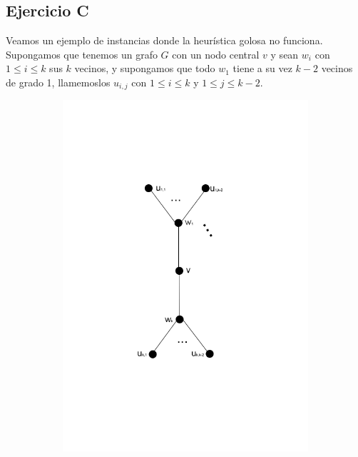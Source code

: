 \subsection{Ejercicio C}

Veamos un ejemplo de instancias donde la heurística golosa no funciona. Supongamos que tenemos un grafo $G$ con un nodo central $v$ y sean $w_i$ con $1 \leq i \leq k$ sus $k$ vecinos, y supongamos que todo $w_1$ tiene a su vez $k-2$ vecinos de grado 1, llamemoslos $u_{i,j}$ con $1 \leq i \leq k$ y $1 \leq j \leq k-2$. \\

\begin{figure}[H]
\centering
\begin{subfigure}[b]{0.5\textwidth}
                \includegraphics[width=\textwidth]{imagenes/grafos-ej3-tp3-1.png}
                \caption{}
        \end{subfigure}%
\end{figure}



